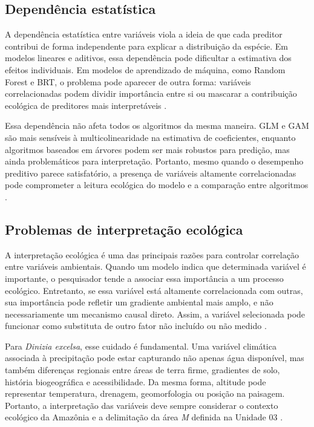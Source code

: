 \subsection{Dependência estatística}

A dependência estatística entre variáveis viola a ideia de que cada preditor contribui de forma independente para explicar a distribuição da espécie. Em modelos lineares e aditivos, essa dependência pode dificultar a estimativa dos efeitos individuais. Em modelos de aprendizado de máquina, como Random Forest e BRT, o problema pode aparecer de outra forma: variáveis correlacionadas podem dividir importância entre si ou mascarar a contribuição ecológica de preditores mais interpretáveis \parencite{dormann2013collinearity,elith2008working}.

Essa dependência não afeta todos os algoritmos da mesma maneira. GLM e GAM são mais sensíveis à multicolinearidade na estimativa de coeficientes, enquanto algoritmos baseados em árvores podem ser mais robustos para predição, mas ainda problemáticos para interpretação. Portanto, mesmo quando o desempenho preditivo parece satisfatório, a presença de variáveis altamente correlacionadas pode comprometer a leitura ecológica do modelo e a comparação entre algoritmos \parencite{dormann2013collinearity,guisan2017habitat}.

\subsection{Problemas de interpretação ecológica}

A interpretação ecológica é uma das principais razões para controlar correlação entre variáveis ambientais. Quando um modelo indica que determinada variável é importante, o pesquisador tende a associar essa importância a um processo ecológico. Entretanto, se essa variável está altamente correlacionada com outras, sua importância pode refletir um gradiente ambiental mais amplo, e não necessariamente um mecanismo causal direto. Assim, a variável selecionada pode funcionar como substituta de outro fator não incluído ou não medido \parencite{elith2009species,franklin2010mapping}.

Para \textit{Dinizia excelsa}, esse cuidado é fundamental. Uma variável climática associada à precipitação pode estar capturando não apenas água disponível, mas também diferenças regionais entre áreas de terra firme, gradientes de solo, história biogeográfica e acessibilidade. Da mesma forma, altitude pode representar temperatura, drenagem, geomorfologia ou posição na paisagem. Portanto, a interpretação das variáveis deve sempre considerar o contexto ecológico da Amazônia e a delimitação da área \textit{M} definida na Unidade 03 \parencite{soberon2007grinnellian,peterson2011ecological}.

